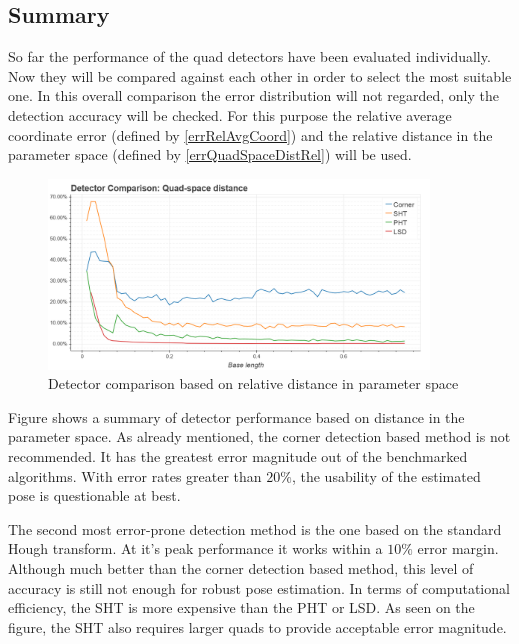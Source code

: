 \subsection{Summary}

So far the performance of the quad detectors have been evaluated individually.
Now they will be compared against each other in order to select the most suitable one.
In this overall comparison the error distribution will not regarded, only the detection accuracy will be checked.
For this purpose the relative average coordinate error (defined by \eqref{errRelAvgCoord}) and the relative distance in the parameter space (defined by \eqref{errQuadSpaceDistRel}) will be used.

\begin{figure}[ht]
	\centering
	\includegraphics[width=0.9\textwidth]{figures/plots/detector_comp_quad_param_space.png}
	\caption{Detector comparison based on relative distance in parameter space}
	\label{fig:detCmpQSpace}
\end{figure}
Figure  shows a summary of detector performance based on distance in the parameter space.
As already mentioned, the corner detection based method is not recommended.
It has the greatest error magnitude out of the benchmarked algorithms.
With error rates greater than $20\%$, the usability of the estimated pose is questionable at best.

The second most error-prone detection method is the one based on the standard Hough transform.
At it's peak performance it works within a $10\%$ error margin.
Although much better than the corner detection based method, this level of accuracy is still not enough for robust pose estimation.
In terms of computational efficiency, the SHT is more expensive than the PHT or LSD.
As seen on the figure, the SHT also requires larger quads to provide acceptable error magnitude.

